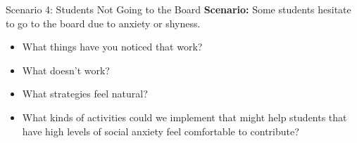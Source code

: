 \documentclass[dvipsnames]{beamer}
\begin{document}

\begin{frame}{Scenario 4: Students Not Going to the Board}
\textbf{Scenario:} Some students hesitate to go to the board due to anxiety or shyness.  
\begin{itemize}
    \item What things have you noticed that work?
    \item What doesn’t work?
    \item What strategies feel natural?
    \item What kinds of activities could we implement that might help students that have high levels of social anxiety feel comfortable to contribute?
\end{itemize}
\end{frame}
\end{document}
